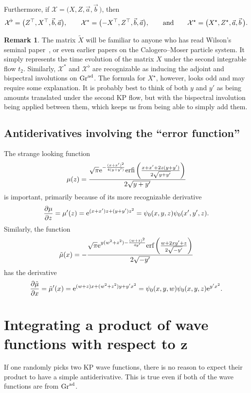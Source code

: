 \documentclass[10pt,a4paper]{amsart}
\numberwithin{equation}{section}
\theoremstyle{definition}
\newtheorem{Remark}[Theorem]{Remark}
\def\X{\mathcal{X}}
\begin{document}
Furthermore, if $\X=\bigl(X,Z,\vec a,\vec b\,\bigr)$, then
 \[
\X^{\flat}=\bigl(Z^{\top},X^{\top},\vec b,\vec a\bigr),\qquad
\X^*=\bigl(-X^{\top},Z^{\top},\vec b,\vec a\bigr),\qquad\hbox{and}\qquad
\X^\star=\bigl(X^\star,Z^\star,\vec a,\vec b\,\bigr).
 \]

 \begin{Remark}
 The matrix $\tilde X$ will be familiar to anyone who has read
 Wilson's seminal paper~\cite{WilsonCM}, or even earlier papers on
 the Calogero--Moser particle system. It simply represents the time
 evolution of the matrix $X$ under the second integrable flow
 $t_2$. Similarly, $\X^*$ and $\X^{\flat}$ are recognizable as inducing the
adjoint and bispectral involutions on ${\rm Gr}^{\rm ad}$.
The formula for $X^\star$, however, looks odd and may require some explanation. It is
 probably best to think of both $y$ and $y'$ as being amounts translated
 under the second KP flow, but with the bispectral involution being
 applied between them, which keeps us from being able to simply add
 them.
 \end{Remark}


\subsection{Antiderivatives involving the ``error function''}\label{sec:mu}
The strange looking function
\[
 \mu(z)=\frac{\sqrt{\pi }
 {\rm e}^{-\frac{(x+x')^2}{4
 (y+y')}}
 \text{erfi}\left(\frac{x+x'+2 z (y+y')}{2
 \sqrt{y+y'}}\right)}{2
 \sqrt{y+y'}}
 \]
is important, primarily because of its more recognizable derivative
 \[ \frac{\partial\mu}{\partial z}=\mu'(z)
={\rm e}^{(x+x')z+(y+y')z^2}=\psi_0(x,y,z)\psi_0(x',y',z).
 \]
Similarly, the function
\[
\tilde\mu(x)=-\frac{\sqrt{\pi } {\rm e}^{y (w^2+z^2)-\frac{(w+z)^2}{4 y'}}
 \text{erf}\left(\frac{w+2 x y'+z}{2
 \sqrt{-y'}}\right)}{2 \sqrt{-y'}}
 \]
has the derivative
\[
\frac{\partial\tilde\mu}{\partial x}=\tilde\mu'(x)={\rm e}^{(w+z)x+(w^2+z^2)y+y'x^2}=\psi_0(x,y,w)\psi_0(x,y,z){\rm e}^{y'x^2}.
\]

\section[Integrating a product of wave functions with respect to z]{Integrating a product of wave functions with respect to $\boldsymbol{z}$}
If one randomly picks two KP wave functions, there is no reason to
expect their product to have a simple antiderivative. This is true
even if both of the wave functions are from ${\rm Gr}^{\rm ad}$.
\end{document}
